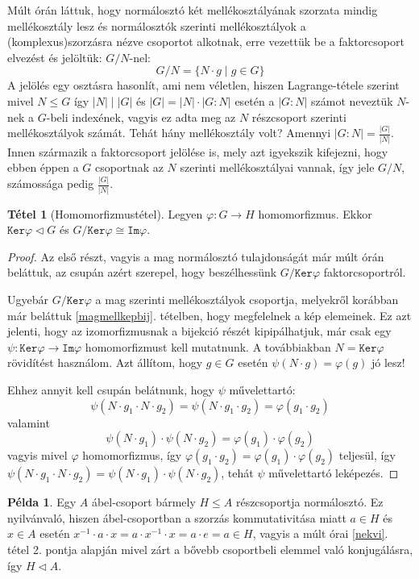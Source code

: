 \documentclass[12pt]{book}
\theoremstyle{plain} %
\theoremstyle{definition} %
\newtheorem{pl}{Példa}[section]
\newtheorem{theo/}{Tétel}[section]
\newenvironment{theo}
  {\renewcommand{\qedsymbol}{$\clubsuit$}%
   \pushQED{\qed}\begin{theo/}}
  {\popQED\end{theo/}}
\theoremstyle{remark}
\renewcommand\qedsymbol{$\blacksquare$}
\numberwithin{equation}{section}  %
\begin{document}
	Múlt órán láttuk, hogy normálosztó két mellékosztályának szorzata mindig mellékosztály lesz és normálosztók szerinti mellékosztályok a (komplexus)szorzásra nézve csoportot alkotnak, erre vezettük be a faktorcsoport elvezést és jelöltük: $G/ N$-nel:
	\[ G/N = \{ N\cdot g \mid g\in G  \}  \]
	A jelölés egy osztásra hasonlít, ami nem véletlen, hiszen Lagrange-tétele szerint mivel $N\leq G$ így $|N|\displaystyle\mid |G|$ és $|G|=|N|\cdot |G:N|$ esetén a $|G:N|$ számot neveztük $N$-nek a $G$-beli indexének, vagyis ez adta meg az $N$ részcsoport szerinti mellékosztályok számát. Tehát hány mellékosztály volt? Amennyi $|G:N| = \frac{|G|}{|N|}$. Innen származik a faktorcsoport jelölése is, mely azt igyekszik kifejezni, hogy ebben éppen a $G$ csoportnak az $N$ szerinti mellékosztályai vannak, így jele $G/N$, számossága pedig $\frac{|G|}{|N|}$.
	
	\begin{theo}[Homomorfizmustétel]
		Legyen $\varphi\colon G\to H$ homomorfizmus. Ekkor $\mathtt{Ker}\varphi \triangleleft G$ és $G/\mathtt{Ker}\varphi \cong \mathtt{Im}\varphi$.
	\end{theo}
	
	\begin{proof}
		Az első részt, vagyis a mag normálosztó tulajdonságát már múlt órán beláttuk, az csupán azért szerepel, hogy beszélhessünk $G/\mathtt{Ker}\varphi$ faktorcsoportról.
		
		Ugyebár $G/\mathtt{Ker}\varphi$ a mag szerinti mellékosztályok csoportja, melyekről korábban már beláttuk \ref{magmellkepbij}. tételben, hogy megfelelnek a kép elemeinek. Ez azt jelenti, hogy az izomorfizmusnak a bijekció részét kipipálhatjuk, már csak egy $\psi\colon \mathtt{Ker}\varphi \to \mathtt{Im}\varphi$ homomorfizmust kell mutatnunk. A továbbiakban $N=\mathtt{Ker}\varphi$ rövidítést használom. Azt állítom, hogy $g\in G$ esetén $\psi(N\cdot g) = \varphi(g)$ jó lesz!
		
		Ehhez annyit kell csupán belátnunk, hogy $\psi$ művelettartó:
		\[ \psi(N\cdot g_1 \cdot N\cdot g_2) = \psi(N\cdot g_1\cdot g_2) = \varphi(g_1\cdot g_2)  \]
		valamint
		\[ \psi(N\cdot g_1) \cdot \psi(N\cdot g_2) = \varphi(g_1) \cdot \varphi(g_2)  \]
		vagyis mivel $\varphi$ homomorfizmus, így $\varphi(g_1\cdot g_2) = \varphi(g_1)\cdot \varphi(g_2)$ teljesül, így $\psi(N\cdot g_1\cdot N\cdot g_2) = \psi(N\cdot g_1) \cdot \psi(N\cdot g_2)$, tehát $\psi$ művelettartó leképezés.
	\end{proof}
	
	\begin{pl}
		Egy $A$ ábel-csoport bármely $H\leq A$ részcsoportja normálosztó. Ez nyilvánvaló, hiszen ábel-csoportban a szorzás kommutativitása miatt $a\in H$ és $x\in A$ esetén $x^{-1}\cdot a \cdot x = a\cdot x^{-1}\cdot x = a\cdot e = a \in H$, vagyis a múlt órai \ref{nekvi}. tétel 2. pontja alapján mivel zárt a bővebb csoportbeli elemmel való konjugálásra, így $H\triangleleft A$.
	\end{pl}
\end{document}
